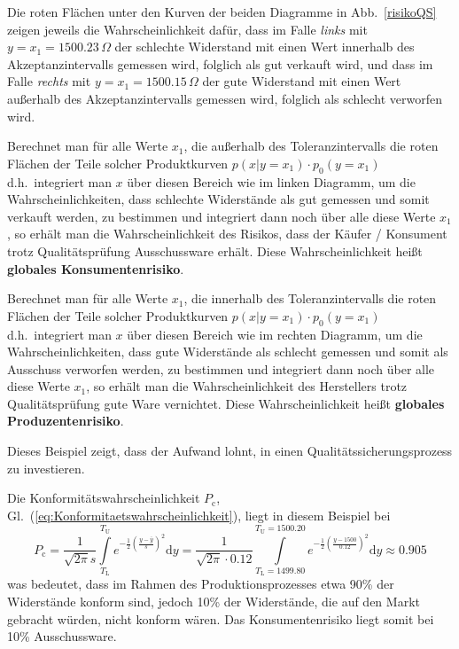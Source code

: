 Die roten Flächen unter den Kurven der beiden Diagramme in Abb.~\ref{risikoQS}
zeigen jeweils die Wahrscheinlichkeit dafür, dass im Falle \textsl{links} mit
$y = x_1 = 1500.23 \, \Omega$ der schlechte Widerstand mit einen Wert innerhalb des
Akzeptanzintervalls gemessen wird, folglich als gut verkauft wird, und dass im Falle \textsl{rechts} mit
$y = x_1 = 1500.15 \, \Omega$ der gute Widerstand mit einen Wert außerhalb des
Akzeptanzintervalls gemessen wird, folglich als schlecht verworfen wird.

Berechnet man für alle Werte $x_1$, die außerhalb des Toleranzintervalls die roten
Flächen der Teile solcher Produktkurven $p(x | y=x_1) \cdot p_0(y=x_1)$ d.h.\ integriert
man $x$ über diesen Bereich wie im linken Diagramm,
 um die Wahrscheinlichkeiten, dass schlechte Widerstände als gut
gemessen und somit verkauft werden, zu bestimmen und integriert dann noch
über alle diese Werte $x_1$, so erhält man die Wahrscheinlichkeit des Risikos, dass
der Käufer / Konsument  trotz Qualitätsprüfung Ausschussware erhält. Diese
Wahrscheinlichkeit heißt \textbf{globales Konsumentenrisiko}.

Berechnet man für alle Werte $x_1$, die innerhalb des Toleranzintervalls die roten
Flächen der Teile solcher Produktkurven $p(x | y=x_1) \cdot p_0(y=x_1)$ d.h.\ integriert
man $x$ über diesen Bereich wie im rechten Diagramm,
 um die Wahrscheinlichkeiten, dass gute Widerstände als schlecht
gemessen und somit als Ausschuss verworfen werden, zu bestimmen und integriert dann noch
über alle diese Werte $x_1$, so erhält man die Wahrscheinlichkeit des Herstellers
trotz Qualitätsprüfung gute Ware vernichtet. Diese
Wahrscheinlichkeit heißt \textbf{globales Produzentenrisiko}.

Dieses Beispiel zeigt, dass der Aufwand lohnt, in einen Qualitätssicherungsprozess zu investieren.

Die Konformitätswahrscheinlichkeit $P_\mathrm{c}$, Gl.~(\ref{eq:Konformitaetswahrscheinlichkeit}), liegt in diesem Beispiel bei
\[
	P_\mathrm{c} = \frac{1}{\sqrt{2 \pi} s} \int\limits_{T_\mathrm{L}}^{T_\mathrm{U}}
e^{-\frac{1}{2}\left(\frac{y - \bar y}{s}\right)^2} \mathrm{d}y  =
\frac{1}{\sqrt{2 \pi} \cdot 0.12} \int\limits_{T_\mathrm{L}=1499.80}^{T_\mathrm{U}=1500.20}
e^{-\frac{1}{2}\left(\frac{y - 1500}{0.12}\right)^2} \mathrm{d}y  \approx 0.905
\]
was bedeutet, dass im Rahmen des Produktionsprozesses etwa 90\% der Widerstände konform sind,
jedoch 10\% der Widerstände, die auf den Markt gebracht würden, nicht konform wären. Das Konsumentenrisiko
liegt somit bei 10\% Ausschussware.

